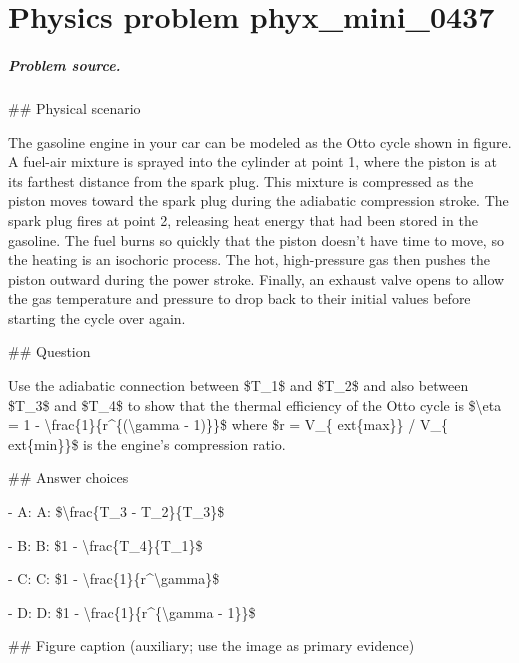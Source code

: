 
\chapter{Physics problem phyx\_mini\_0437}
\label{ch:PhyXMiniProblems_problem_phyx_mini_0437}

\paragraph{Problem source.}
\#\# Physical scenario

The gasoline engine in your car can be modeled as the Otto cycle shown in figure. A fuel-air mixture is sprayed into the cylinder at point 1, where the piston is at its farthest distance from the spark plug. This mixture is compressed as the piston moves toward the spark plug during the adiabatic compression stroke. The spark plug fires at point 2, releasing heat energy that had been stored in the gasoline. The fuel burns so quickly that the piston doesn't have time to move, so the heating is an isochoric process. The hot, high-pressure gas then pushes the piston outward during the power stroke. Finally, an exhaust valve opens to allow the gas temperature and pressure to drop back to their initial values before starting the cycle over again.

\#\# Question

Use the adiabatic connection between \$T\_1\$ and \$T\_2\$ and also between \$T\_3\$ and \$T\_4\$ to show that the thermal efficiency of the Otto cycle is \$\textbackslash{}eta = 1 - \textbackslash{}frac\{1\}\{r\textasciicircum{}\{(\textbackslash{}gamma - 1)\}\}\$ where \$r = V\_\{	ext\{max\}\} / V\_\{	ext\{min\}\}\$ is the engine's compression ratio.

\#\# Answer choices

- A: A: \$\textbackslash{}frac\{T\_3 - T\_2\}\{T\_3\}\$

- B: B: \$1 - \textbackslash{}frac\{T\_4\}\{T\_1\}\$

- C: C: \$1 - \textbackslash{}frac\{1\}\{r\textasciicircum{}\textbackslash{}gamma\}\$

- D: D: \$1 - \textbackslash{}frac\{1\}\{r\textasciicircum{}\{\textbackslash{}gamma - 1\}\}\$

\#\# Figure caption (auxiliary; use the image as primary evidence)


